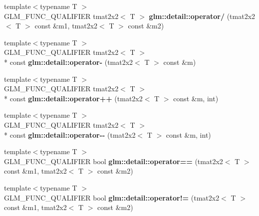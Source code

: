 \begin{DoxyCompactItemize}
\item 
\hypertarget{namespaceglm_1_1detail_ab5912b54dc7146602edd91f006f4462b}{{\footnotesize template$<$typename T $>$ }\\G\-L\-M\-\_\-\-F\-U\-N\-C\-\_\-\-Q\-U\-A\-L\-I\-F\-I\-E\-R tmat2x2$<$ T $>$ {\bfseries glm\-::detail\-::operator/} (tmat2x2$<$ T $>$ const \&m1, tmat2x2$<$ T $>$ const \&m2)}\label{namespaceglm_1_1detail_ab5912b54dc7146602edd91f006f4462b}

\item 
\hypertarget{namespaceglm_1_1detail_a390878b96c35ed9f2001ef52fab96b76}{{\footnotesize template$<$typename T $>$ }\\G\-L\-M\-\_\-\-F\-U\-N\-C\-\_\-\-Q\-U\-A\-L\-I\-F\-I\-E\-R tmat2x2$<$ T $>$\\*
 const {\bfseries glm\-::detail\-::operator-\/} (tmat2x2$<$ T $>$ const \&m)}\label{namespaceglm_1_1detail_a390878b96c35ed9f2001ef52fab96b76}

\item 
\hypertarget{namespaceglm_1_1detail_a338c3904586ef319fbf88ab1c82a593f}{{\footnotesize template$<$typename T $>$ }\\G\-L\-M\-\_\-\-F\-U\-N\-C\-\_\-\-Q\-U\-A\-L\-I\-F\-I\-E\-R tmat2x2$<$ T $>$\\*
 const {\bfseries glm\-::detail\-::operator++} (tmat2x2$<$ T $>$ const \&m, int)}\label{namespaceglm_1_1detail_a338c3904586ef319fbf88ab1c82a593f}

\item 
\hypertarget{namespaceglm_1_1detail_a76d3f6b9f19cce3637dd5d05d927dd84}{{\footnotesize template$<$typename T $>$ }\\G\-L\-M\-\_\-\-F\-U\-N\-C\-\_\-\-Q\-U\-A\-L\-I\-F\-I\-E\-R tmat2x2$<$ T $>$\\*
 const {\bfseries glm\-::detail\-::operator-\/-\/} (tmat2x2$<$ T $>$ const \&m, int)}\label{namespaceglm_1_1detail_a76d3f6b9f19cce3637dd5d05d927dd84}

\item 
\hypertarget{namespaceglm_1_1detail_a7daa55112beb0033907dff7a695ff975}{{\footnotesize template$<$typename T $>$ }\\G\-L\-M\-\_\-\-F\-U\-N\-C\-\_\-\-Q\-U\-A\-L\-I\-F\-I\-E\-R bool {\bfseries glm\-::detail\-::operator==} (tmat2x2$<$ T $>$ const \&m1, tmat2x2$<$ T $>$ const \&m2)}\label{namespaceglm_1_1detail_a7daa55112beb0033907dff7a695ff975}

\item 
\hypertarget{namespaceglm_1_1detail_afaa47f0fdaa00c1707b046975bf24407}{{\footnotesize template$<$typename T $>$ }\\G\-L\-M\-\_\-\-F\-U\-N\-C\-\_\-\-Q\-U\-A\-L\-I\-F\-I\-E\-R bool {\bfseries glm\-::detail\-::operator!=} (tmat2x2$<$ T $>$ const \&m1, tmat2x2$<$ T $>$ const \&m2)}\label{namespaceglm_1_1detail_afaa47f0fdaa00c1707b046975bf24407}

\end{DoxyCompactItemize}


